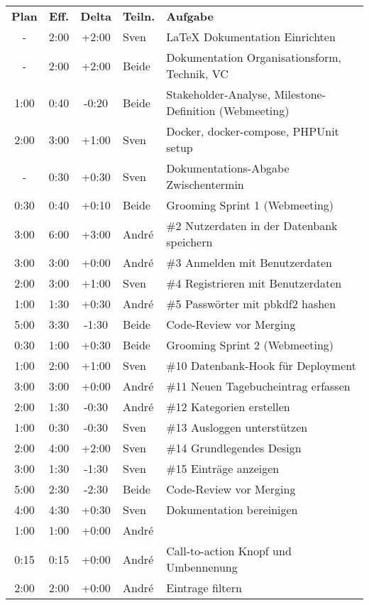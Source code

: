 \begin{longtable}{ c c c l l }
  \textbf{Plan} & \textbf{Eff.} & \textbf{Delta} & \textbf{Teiln.} & \textbf{Aufgabe} \\
  - & 2:00 & +2:00 & Sven & LaTeX Dokumentation Einrichten \\
  - & 2:00 & +2:00 & Beide & Dokumentation Organisationsform, Technik, VC\\
  1:00 & 0:40 & -0:20 & Beide & Stakeholder-Analyse, Milestone-Definition (Webmeeting) \\
  2:00 & 3:00 & +1:00 & Sven & Docker, docker-compose, PHPUnit setup \\
  - & 0:30 & +0:30 & Sven & Dokumentations-Abgabe Zwischentermin \\ 
  0:30 & 0:40 & +0:10 & Beide & Grooming Sprint 1 (Webmeeting) \\
  3:00 & 6:00 & +3:00 & André & \#2 Nutzerdaten in der Datenbank speichern \\
  3:00 & 3:00 & +0:00 & André & \#3 Anmelden mit Benutzerdaten \\
  2:00 & 3:00 & +1:00 & Sven & \#4 Registrieren mit Benutzerdaten \\
  1:00 & 1:30 & +0:30 & André & \#5 Passwörter mit pbkdf2 hashen \\
  5:00 & 3:30 & -1:30 & Beide & Code-Review vor Merging \\
  0:30 & 1:00 & +0:30 & Beide & Grooming Sprint 2 (Webmeeting) \\
  1:00 & 2:00 & +1:00 & Sven & \#10 Datenbank-Hook für Deployment \\
  3:00 & 3:00 & +0:00 & André & \#11 Neuen Tagebucheintrag erfassen \\
  2:00 & 1:30 & -0:30 & André & \#12 Kategorien erstellen \\
  1:00 & 0:30 & -0:30 & Sven & \#13 Ausloggen unterstützen \\
  2:00 & 4:00 & +2:00 & Sven & \#14 Grundlegendes Design \\
  3:00 & 1:30 & -1:30 & Sven & \#15 Einträge anzeigen \\
  5:00 & 2:30 & -2:30 & Beide & Code-Review vor Merging \\
  4:00 & 4:30 & +0:30 & Sven & Dokumentation bereinigen \\
  1:00 & 1:00 & +0:00 & André & #22 Commit-Version anzeigen \\
  0:15 & 0:15 & +0:00 & André & Call-to-action Knopf und Umbennenung \\
  2:00 & 2:00 & +0:00 & André & Eintrage filtern \\
\end{longtable}
